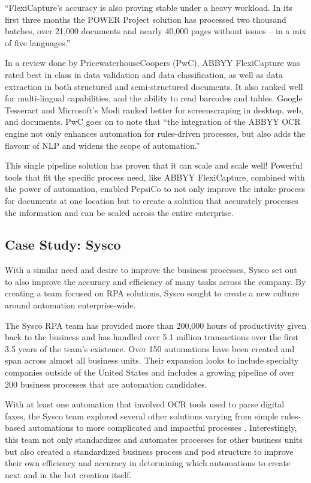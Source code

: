 \documentclass[conference]{IEEEtran}
\begin{document}
``FlexiCapture's accuracy is also proving stable under a heavy workload. In its first three months the POWER Project solution has processed two thousand batches, over 21,000 documents and nearly 40,000 pages without issues – in a mix of five languages.'' \cite{pepsico}

In a review done by PricewaterhouseCoopers (PwC), ABBYY FlexiCapture was rated best in class in data validation and data classification, as well as data extraction in both structured and semi-structured documents. It also ranked well for multi-lingual capabilities, and the ability to read barcodes and tables. Google Tesseract and Microsoft's Modi ranked better for screenscraping in desktop, web, and documents. PwC goes on to note that ``the integration of the ABBYY OCR engine not only enhances automation for rules-driven processes, but also adds the flavour of NLP and widens the scope of automation.'' \cite{pwc2018robotic}

This single pipeline solution has proven that it can scale and scale well! Powerful tools that fit the specific process need, like ABBYY FlexiCapture, combined with the power of automation, enabled PepsiCo to not only improve the intake process for documents at one location but to create a solution that accurately processes the information and can be scaled across the entire enterprise.

\subsection{Case Study: Sysco}
With a similar need and desire to improve the business processes, Sysco set out to also improve the accuracy and efficiency of many tasks across the company. By creating a team focused on RPA solutions, Sysco sought to create a new culture around automation enterprise-wide.

The Sysco RPA team has provided more than 200,000 hours of productivity given back to the business and has handled over 5.1 million transactions over the first 3.5 years of the team's existence. Over 150 automations have been created and span across almost all business units. Their expansion looks to include specialty companies outside of the United States and includes a growing pipeline of over 200 business processes that are automation candidates. \cite{bpcafe2021sysco:slides}

With at least one automation that involved OCR tools used to parse digital faxes, the Sysco team explored several other solutions varying from simple rules-based automations to more complicated and impactful processes \cite{bpcafe2021sysco}. Interestingly, this team not only standardizes and automates processes for other business units but also created a standardized business process and pod structure to improve their own efficiency and accuracy in determining which automations to create next and in the bot creation itself.
\end{document}
